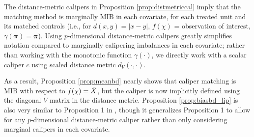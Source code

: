 \documentclass{article}
\begin{document}
The distance-metric calipers in Proposition \ref{prop:distmetriccal} imply that the matching method  is marginally MIB in each covariate, for each treated unit and its matched controls (i.e., for $d(x,y)=|x-y|$, $f(\chi)$ = observation of interest, $\gamma(\boldsymbol{\pi})=\boldsymbol{\pi}$).
Using $p$-dimensional distance-metric calipers greatly simplifies notation compared to marginally calipering imbalances in each covariate;
rather than working with the monotonic function $\gamma(\cdot)$, we directly work with a scalar caliper $c$ using scaled distance metric $d_V(\cdot, \cdot)$.

As a result, Proposition \ref{prop:meanbd} nearly shows that caliper matching is MIB with respect to $f(\chi)=\Bar{X}$, but the caliper is now implicitly defined using the diagonal $V$ matrix in the distance metric.
Proposition \ref{prop:biasbd_lip} is also very similar to Proposition 1 in \citet{iacus2011multivariate}, though it generalizes Proposition 1 to allow for any $p$-dimensional distance-metric caliper rather than only considering marginal calipers in each covariate.



\end{document}

